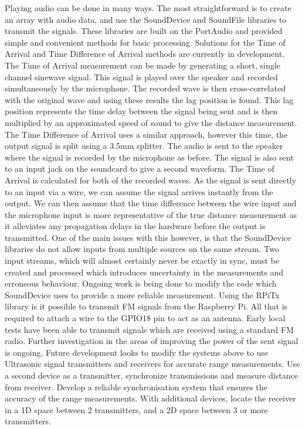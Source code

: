 \documentclass[]{final_report}
\begin{document}
Playing audio can be done in many ways. The most straightforward is to create an array with audio data, and use the SoundDevice \cite{python-sounddevice} and SoundFile \cite{pysoundfile} libraries to transmit the signals. These libraries are built on the PortAudio \cite{bencina2001portaudio} and provided simple and convenient methods for basic processing. Solutions for the Time of Arrival and Time Difference of Arrival methods are currently in development. The Time of Arrival measurement can be made by generating a short, single channel sinewave signal. This signal is played over the speaker and recorded simultaneously by the microphone. The recorded wave is then cross-correlated with the original wave and using these results the lag position is found. This lag position represents the time delay between the signal being sent and is then multiplied by an approximated speed of sound to give the distance measurement.
The Time Difference of Arrival uses a similar approach, however this time, the output signal is split using a 3.5mm splitter. The audio is sent to the speaker where the signal is recorded by the microphone as before. The signal is also sent to an input jack on the soundcard to give a second waveform. The Time of Arrival is calculated for both of the recorded waves. As the signal is sent directly to an input via a wire, we can assume the signal arrives instantly from the output. We can then assume that the time difference between the wire input and the microphone input is more representative of the true distance measurement as it alleviates any propagation delays in the hardware before the output is transmitted. One of the main issues with this however, is that the SoundDevice libraries do not allow inputs from multiple sources on the same stream. Two input streams, which will almost certainly never be exactly in sync, must be created and processed which introduces uncertainty in the measurements and erroneous behaviour. Ongoing work is being done to modify the code which SoundDevice uses to provide a more reliable measurement. 
Using the RPiTx \cite{f5oeo_2017} library is it possible to transmit FM signals from the Raspberry Pi. All that is required to attach a wire to the GPIO18 pin to act as an antenna. Early local tests have been able to transmit signals which are received using a standard FM radio. Further investigation in the areas of improving the power of the sent signal is ongoing.
Future development looks to modify the systems above to use Ultrasonic signal transmitters and receivers for accurate range measurements. Use a second device as a transmitter, synchronize transmissions and measure distance from receiver. Develop a reliable synchronisation system that ensures the accuracy of the range measurements. With additional devices, locate the receiver in a 1D space between 2 transmitters, and a 2D space between 3 or more transmitters.
\end{document}
